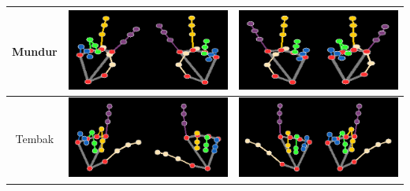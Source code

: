 \begin{table}[H]
\begin{tabular}{|c|c|c|}
  Mundur & \includegraphics[width=0.3\linewidth]{../Gambar/Mundur (1).png} & \includegraphics[width=0.3\linewidth]{../Gambar/MundurI (1).png} \\ \hline
  Tembak & \includegraphics[width=0.3\linewidth]{../Gambar/Tembak (1).png} & \includegraphics[width=0.3\linewidth]{../Gambar/TembakI (1).png} \\ \hline
  \end{tabular}
\end{table}




